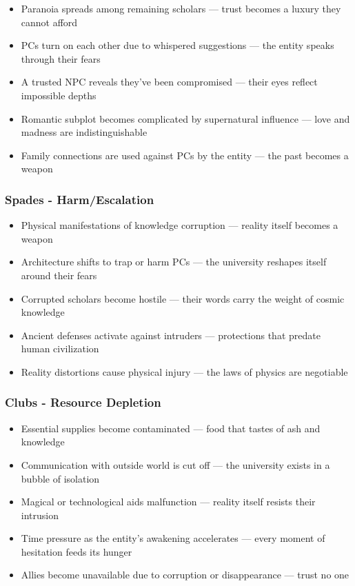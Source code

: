 \documentclass[11pt]{article}
\begin{document}
\begin{itemize}
\item Paranoia spreads among remaining scholars — trust becomes a luxury they cannot afford
\item PCs turn on each other due to whispered suggestions — the entity speaks through their fears
\item A trusted NPC reveals they've been compromised — their eyes reflect impossible depths
\item Romantic subplot becomes complicated by supernatural influence — love and madness are indistinguishable
\item Family connections are used against PCs by the entity — the past becomes a weapon
\end{itemize}

\subsubsection{Spades - Harm/Escalation}

\begin{itemize}
\item Physical manifestations of knowledge corruption — reality itself becomes a weapon
\item Architecture shifts to trap or harm PCs — the university reshapes itself around their fears
\item Corrupted scholars become hostile — their words carry the weight of cosmic knowledge
\item Ancient defenses activate against intruders — protections that predate human civilization
\item Reality distortions cause physical injury — the laws of physics are negotiable
\end{itemize}

\subsubsection{Clubs - Resource Depletion}

\begin{itemize}
\item Essential supplies become contaminated — food that tastes of ash and knowledge
\item Communication with outside world is cut off — the university exists in a bubble of isolation
\item Magical or technological aids malfunction — reality itself resists their intrusion
\item Time pressure as the entity's awakening accelerates — every moment of hesitation feeds its hunger
\item Allies become unavailable due to corruption or disappearance — trust no one
\end{itemize}
\end{document}
